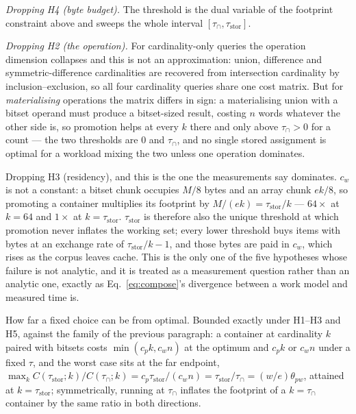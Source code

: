 \emph{Dropping H4 (byte budget).} The threshold is the dual variable of the footprint constraint above
and sweeps the whole interval $[\tau_\cap,\tau_{\mathrm{stor}}]$.

\emph{Dropping H2 (the operation).} For cardinality-only queries the operation dimension collapses and
this is not an approximation: union, difference and symmetric-difference cardinalities are recovered
from intersection cardinality by inclusion--exclusion, so all four cardinality queries share one cost
matrix. But for \emph{materialising} operations the matrix differs in sign: a materialising union with
a bitset operand must produce a bitset-sized result, costing $n$ words whatever the other side is, so
promotion helps at every $k$ there and only above $\tau_\cap>0$ for a count --- the two thresholds are
$0$ and $\tau_\cap$, and no single stored assignment is optimal for a workload mixing the two unless one
operation dominates.

Dropping H3 (residency), and this is the one the measurements say dominates. $c_w$ is not a
constant: a bitset chunk occupies $M/8$ bytes and an array chunk $ek/8$, so promoting a container
multiplies its footprint by $M/(ek)=\tau_{\mathrm{stor}}/k$ --- $64\times$ at $k=64$ and $1\times$ at
$k=\tau_{\mathrm{stor}}$. $\tau_{\mathrm{stor}}$ is therefore also the unique threshold at which
promotion never inflates the working set; every lower threshold buys items with bytes at an exchange
rate of $\tau_{\mathrm{stor}}/k-1$, and those bytes are paid in $c_w$, which rises as the corpus leaves
cache. This is the only one of the five hypotheses whose failure is not analytic, and it is treated as
a measurement question rather than an analytic one, exactly as Eq.~\eqref{eq:compose}'s divergence
between a work model and measured time is.

How far a fixed choice can be from optimal. Bounded exactly under H1--H3 and H5, against the
family of the previous paragraph: a container at cardinality $k$ paired with bitsets costs
$\min(c_pk,c_wn)$ at the optimum and $c_pk$ or $c_wn$ under a fixed $\tau$, and the worst case sits at
the far endpoint, $\max_kC(\tau_{\mathrm{stor}};k)/C(\tau_\cap;k)=c_p\tau_{\mathrm{stor}}/(c_wn)
=\tau_{\mathrm{stor}}/\tau_\cap=(w/e)\theta_{pw}$, attained at $k=\tau_{\mathrm{stor}}$; symmetrically,
running at $\tau_\cap$ inflates the footprint of a $k=\tau_\cap$ container by the same ratio in both
directions.


